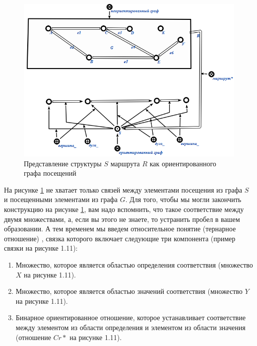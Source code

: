 \begin{figure}
  \centering
  \includegraphics[scale=0.8]{images/2/Route_as_correspondence_Incomplete}
  \caption{Представление структуры $S$ маршрута $R$ как ориентированного графа посещений}
  \label{fig:Route_as_correspondence_Incomplete}
\end{figure}

На рисунке \ref{fig:Route_as_correspondence_Incomplete} не хватает
только связей между элементами посещения из графа $S$ и посещенными
элементами из графа $G$. Для того, чтобы мы могли закончить
конструкцию на рисунке \ref{fig:Route_as_correspondence_Incomplete},
вам надо вспомнить, что такое соответствие между двумя множествами, а,
если вы этого не знаете, то устранить пробел в вашем образовании. А
тем временем мы введем относительное понятие (тернарное отношение)
, связка которого включает следующие три
компонента (пример связки на рисунке 1.11):

\begin{enumerate}
\item Множество, которое является областью определения соответствия
  (множество $X$ на рисунке 1.11).
\item Множество, которое является областью значений соответствия
  (множество $Y$ на рисунке 1.11).
\item Бинарное ориентированное отношение, которое устанавливает
  соответствие между элементом из области определения и элементом из
  области значения (отношение $Cr*$ на рисунке 1.11).
\end{enumerate}

